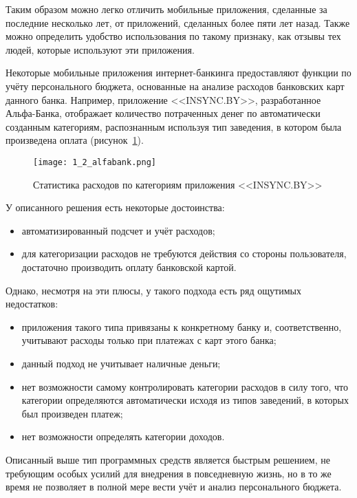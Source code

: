 Таким образом можно легко отличить мобильные приложения, сделанные за последние несколько лет, от приложений, сделанных более пяти лет назад.
Также можно определить удобство использования по такому признаку, как отзывы тех людей, которые используют эти приложения.

Некоторые мобильные приложения интернет-банкинга предоставляют функции по учёту персонального бюджета, основанные на анализе расходов банковских карт данного банка.
Например, приложение <<INSYNC.BY>>, разработанное Альфа-Банка, отображает количество потраченных денег по автоматически созданным категориям, распознанным используя тип заведения, в котором была произведена оплата (рисунок~\ref{fig:analysis:analogues:alfabank}).

\begin{figure}[H]
    \centering
    \texttt{[image: 1\_2\_alfabank.png]}
    \caption{Статистика расходов по категориям приложения <<INSYNC.BY>>}
    \label{fig:analysis:analogues:alfabank}
\end{figure}

У описанного решения есть некоторые достоинства:
\begin{itemize}
    \item автоматизированный подсчет и учёт расходов;
    \item для категоризации расходов не требуются действия со стороны пользователя, достаточно производить оплату банковской картой.
\end{itemize}

Однако, несмотря на эти плюсы, у такого подхода есть ряд ощутимых недостатков:
\begin{itemize}
    \item приложения такого типа привязаны к конкретному банку и, соответственно, учитывают расходы только при платежах с карт этого банка;
    \item данный подход не учитывает наличные деньги;
    \item нет возможности самому контролировать категории расходов в силу того, что категории определяются автоматически исходя из типов заведений, в которых был произведен платеж;
    \item нет возможности определять категории доходов.
\end{itemize}

Описанный выше тип программных средств является быстрым решением, не требующим особых усилий для внедрения в повседневную жизнь, но в то же время не позволяет в полной мере вести учёт и анализ персонального бюджета.

